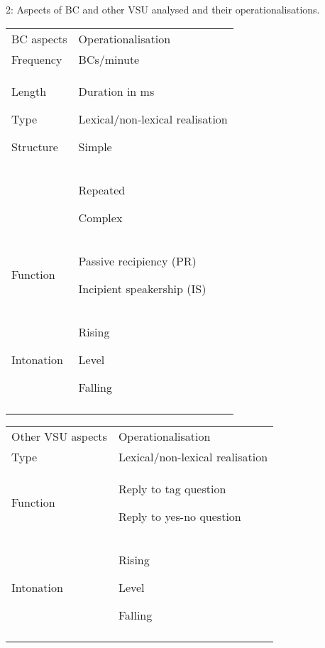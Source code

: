 \begin{stylelsTableHeading}%
\begin{table}
\caption{2: Aspects of BC and other VSU analysed and their operationalisations.}
\label{tab:key:4}
\end{table}\end{stylelsTableHeading}


\begin{tabularx}{\textwidth}{XX}

\lsptoprule

BC aspects & Operationalisation\\
Frequency & BCs/minute \\
Length

Type

Structure & Duration in ms

Lexical/non-lexical realisation 

Simple\\
& Repeated

Complex\\
Function & Passive recipiency (PR)

Incipient speakership (IS)\\
Intonation & Rising

Level

Falling\\
\lspbottomrule
\end{tabularx}
\bfseries


\begin{tabularx}{\textwidth}{XX}

\lsptoprule

Other VSU aspects & Operationalisation\\
Type & Lexical/non-lexical realisation \\
Function & Reply to tag question 

Reply to yes-no question\\
Intonation & Rising

Level

Falling\\
\lspbottomrule
\end{tabularx}
